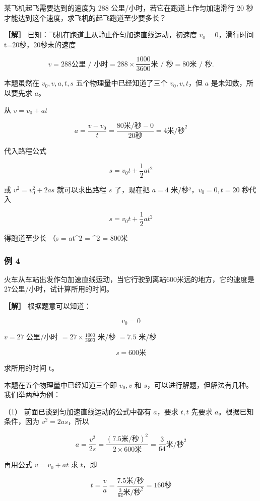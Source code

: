 某飞机起飞需要达到的速度为 288 公里/小时，若它在跑道上作匀加速滑行 20
秒才能达到这个速度，求飞机的起飞跑道至少要多长？

\textbf{［解］} 已知：飞机在跑道上从静止作匀加速直线运动，初速度
\(v_{0}=0\)，滑行时间t=20秒，20秒末的速度

\[
v = 288 \text{公里 / 小时} = 288 \times \frac {1000}{3600} \text{米 / 秒} = 80 \text{米 / 秒}.
\]

本题虽然在 \(v_{0}, v, a, t, s\) 五个物理量中已经知道了三个
\(v_{0}, v, t\)，但 \(a\) 是未知数，所以要先求 \(a\)。

从 \(v = v_0 + at\)

\[
a = \frac {v - v _ {0}}{t} = \frac {80 \text{米/秒} - 0}{20 \text{秒}} = 4 \text{米/秒} ^ {2}
\]

代入路程公式

\[
s = v _ {0} t + \frac {1}{2} a t ^ {2}
\]

或 \(v^{2} = v_{0}^{2} + 2as\) 就可以求出路程 \(s\) 了，现在把 \(a = 4\)
米/秒²，\(v_{0} = 0, t = 20\) 秒代入

\[
s = v _ {0} t + \frac {1}{2} a t ^ {2}
\]

得跑道至少长 （s = at\^{}2 = \^{}2
= 800米

\subsubsection{例 4}\label{ux4f8b-4-3}

火车从车站出发作匀加速直线运动，当它行驶到离站600米远的地方，它的速度是27公里/小时，试计算所用的时间。

\textbf{［解］} 根据题意可以知道：

\[
v _ {0} = 0
\]

\(v = 27\) 公里/小时 \(= 27 \times \frac{1000}{3600}\) 米/秒 \(= 7.5\)
米/秒

\[
s = 600 \text{米}
\]

求所用的时间 t。

本题在五个物理量中已经知道三个即 \(v_{0}, v\) 和
\(s\)，可以进行解题，但解法有几种。我们举两种为例：

（1） 前面已谈到匀加速直线运动的公式中都有 \(a\)，要求 \(t, t\) 先要求
\(a\)。根据已知条件，因为 \(v^2 = 2as\)，所以

\[
a=\frac{v^{2}}{2s} =\frac{(7.5\text{米/秒})^{2}}{2\times600\text{米}} =\frac{3}{64}\text{米/秒}^{2}
\]

再用公式 \(v = v_0 + at\) 求 \(t\)，即

\[
t=\frac{v}{a} =\frac{7.5\text{米/秒}}{\frac{3}{64}\text{米/秒}^{2}} =160\text{秒}
\]

